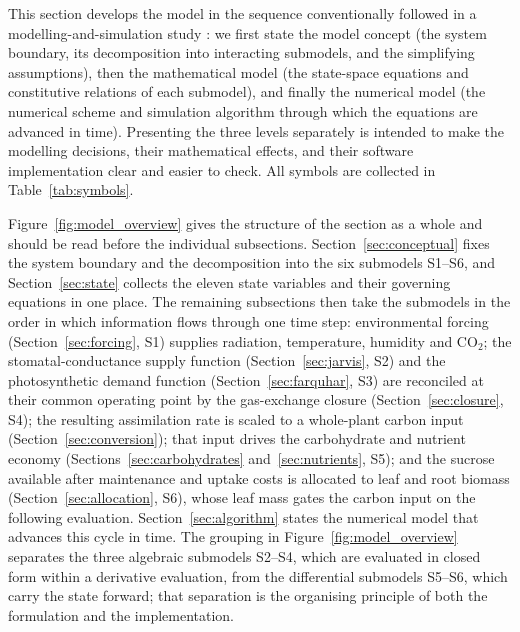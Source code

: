 \documentclass[a4paper,fleqn]{cas-sc}
\begin{document}
This section develops the model in the sequence conventionally followed in
a modelling-and-simulation study \citep{Cellier1991,Zeigler2000}: we first
state the model concept (the system boundary, its decomposition into
interacting submodels, and the simplifying assumptions), then the
mathematical model (the state-space equations and constitutive relations of
each submodel), and finally the numerical model (the numerical scheme
and simulation algorithm through which the equations are advanced in time).
Presenting the three levels separately is intended to make the modelling
decisions, their mathematical effects, and their software implementation
clear and easier to check. All symbols are
collected in Table~\ref{tab:symbols}.

Figure~\ref{fig:model_overview} gives the structure of the section as a
whole and should be read before the individual subsections.
Section~\ref{sec:conceptual} fixes the system boundary and the
decomposition into the six submodels S1--S6, and
Section~\ref{sec:state} collects the eleven state variables and their
governing equations in one place. The remaining subsections then take the
submodels in the order in which information flows through one time step:
environmental forcing (Section~\ref{sec:forcing}, S1) supplies
radiation, temperature, humidity and CO$_2$; the stomatal-conductance
supply function (Section~\ref{sec:jarvis}, S2) and the photosynthetic
demand function (Section~\ref{sec:farquhar}, S3) are reconciled at
their common operating point by the gas-exchange closure
(Section~\ref{sec:closure}, S4); the resulting assimilation rate is scaled
to a whole-plant carbon input (Section~\ref{sec:conversion}); that input
drives the carbohydrate and nutrient economy
(Sections~\ref{sec:carbohydrates} and~\ref{sec:nutrients}, S5); and the
sucrose available after maintenance and uptake costs is allocated to leaf
and root biomass (Section~\ref{sec:allocation}, S6), whose leaf mass gates
the carbon input on the following evaluation. Section~\ref{sec:algorithm}
states the numerical model that advances this cycle in time. The grouping in
Figure~\ref{fig:model_overview} separates the three algebraic submodels
S2--S4, which are evaluated in closed form within a derivative evaluation,
from the differential submodels S5--S6, which carry the state forward; that
separation is the organising principle of both the formulation and the
implementation.
\end{document}

